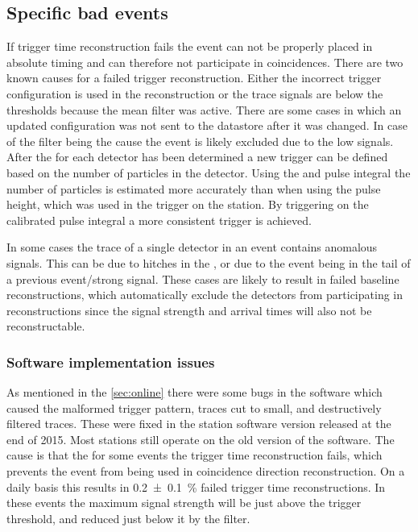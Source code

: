 \subsection{Specific bad events}

If trigger time reconstruction fails the event can not be properly placed in absolute \gps timing and can therefore not participate in coincidences. There are two known causes for a failed trigger reconstruction. Either the incorrect trigger configuration is used in the reconstruction or the trace signals are below the thresholds because the mean filter was active. There are some cases in which an updated configuration was not sent to the datastore after it was changed. In case of the filter being the cause the event is likely excluded due to the low signals. After the \mpv for each detector has been determined a new trigger can be defined based on the number of particles in the detector. Using the \mpv and pulse integral the number of particles is estimated more accurately than when using the pulse height, which was used in the trigger on the station. By triggering on the calibrated pulse integral a more consistent trigger is achieved.

In some cases the trace of a single detector in an event contains anomalous signals. This can be due to hitches in the \pmt, or due to the event being in the tail of a previous event/strong signal. These cases are likely to result in failed baseline reconstructions, which automatically exclude the detectors from participating in reconstructions since the signal strength and arrival times will also not be reconstructable.


\subsubsection{Software implementation issues}

As mentioned in the \cref{sec:online} there were some bugs in the software which caused the malformed trigger pattern, traces cut to small, and destructively filtered traces. These were fixed in the \hisparc station software version released at the end of 2015. Most stations still operate on the old version of the software. The cause is that the for some events the trigger time reconstruction fails, which prevents the event from being used in coincidence direction reconstruction. On a daily basis this results in \SI{0.2 \pm 0.1}{\percent} failed trigger time reconstructions. In these events the maximum signal strength will be just above the trigger threshold, and reduced just below it by the filter.
